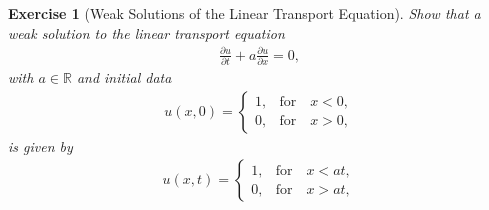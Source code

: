 \documentclass[10pt,letterpaper]{article}
\theoremstyle{break}
\newtheorem{exercise}{Exercise}
\newtheorem{mysolution}{Solution}
\newenvironment{solution}{\begin{mysolution}}{\end{mysolution}}
\begin{document}
%
%    



\begin{exercise}[Weak Solutions of the Linear Transport Equation]
    Show that a weak solution to the linear transport equation 
    \begin{gather*}
    	\frac{\partial u}{\partial t} 
    	+ 
    	a 
    	\frac{\partial u}{\partial x}  = 0, 
    \end{gather*}
    with $a\in \mathbb{R}$ and initial data 
    \begin{align}
    	u(x,0) = 
    	\left\{
    	\begin{array}{ll}
    	1, & \text{for} \quad x<0,\\
    	0, &\text{for} \quad x > 0,
    	\end{array}
    	\right.
    \end{align}
    is given by
    \begin{align} 
    	u(x,t) = 
    	\left\{
    	\begin{array}{ll}
    	1, & \text{for} \quad x<at,\\
    	0, & \text{for} \quad x > at,
    	\end{array}
    	\right.
    \end{align}
\end{exercise}
\end{document}
